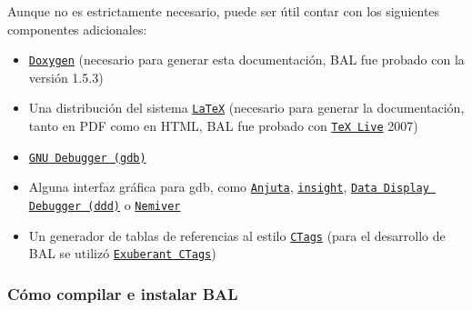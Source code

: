 Aunque no es estrictamente necesario, puede ser útil contar con los siguientes componentes adicionales: \begin{itemize}
\item \href{http://es.wikipedia.org/wiki/Doxygen}{\tt Doxygen} (necesario para generar esta documentación, BAL fue probado con la versión 1.5.3) \item Una distribución del sistema \href{http://es.wikipedia.org/wiki/LaTeX}{\tt LaTeX} (necesario para generar la documentación, tanto en PDF como en HTML, BAL fue probado con \href{http://en.wikipedia.org/wiki/TeX_Live}{\tt TeX Live} 2007) \item \href{http://es.wikipedia.org/wiki/GNU_Debugger}{\tt GNU Debugger (gdb)} \item Alguna interfaz gráfica para gdb, como \href{http://es.wikipedia.org/wiki/Anjuta}{\tt Anjuta}, \href{http://sourceware.org/insight/}{\tt insight}, \href{http://es.wikipedia.org/wiki/Data_Display_Debugger}{\tt Data Display Debugger (ddd)} o \href{http://home.gna.org/nemiver/}{\tt Nemiver} \item Un generador de tablas de referencias al estilo \href{http://en.wikipedia.org/wiki/Ctags}{\tt CTags} (para el desarrollo de BAL se utilizó \href{http://ctags.sourceforge.net/}{\tt Exuberant CTags}) \end{itemize}
\hypertarget{index_compilesec}{}\subsubsection{Cómo compilar e instalar BAL}\label{index_compilesec}

